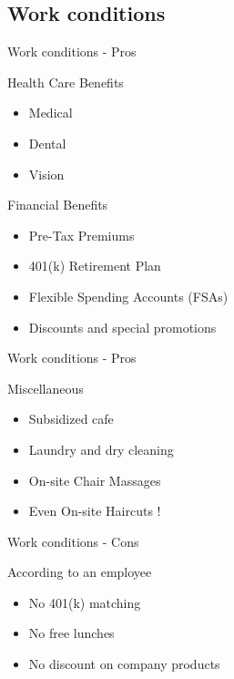 \documentclass{beamer}
\begin{document}
\subsection{Work conditions}
\begin{frame}{Work conditions - Pros}

	\begin{block}{Health Care Benefits}
		\begin{itemize}
			\item<+->{Medical}
			\item<+->{Dental}
			\item<+->{Vision}
		\end{itemize}
	\end{block}
	\pause
	\begin{block}{Financial Benefits}
		\begin{itemize}
			\item<+->{Pre-Tax Premiums}
			\item<+->{401(k) Retirement Plan}
			\item<+->{Flexible Spending Accounts (FSAs)}
			\item<+->{Discounts and special promotions}
		\end{itemize}
	\end{block}
\end{frame}

\begin{frame}{Work conditions - Pros}
	\begin{block}{Miscellaneous}
		\begin{itemize}
			\item<+->{Subsidized cafe}
			\item<+->{Laundry and dry cleaning}
			\item<+->{On-site Chair Massages}
			\item<+->{Even On-site Haircuts !}
		\end{itemize}
	\end{block}
\end{frame}

\begin{frame}{Work conditions - Cons}
	\begin{block}{According to an employee}
		\begin{itemize}
			\item<+->{No 401(k) matching}
			\item<+->{No free lunches}
			\item<+->{No discount on company products}
		\end{itemize}
	\end{block}
\end{frame}
\end{document}
